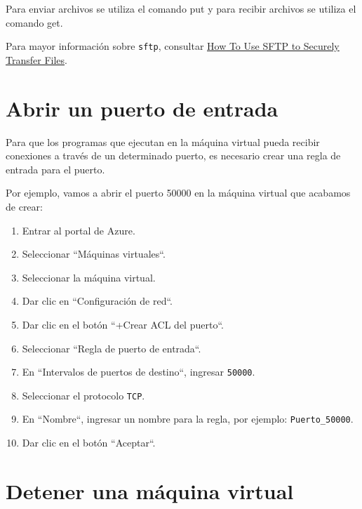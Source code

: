 \documentclass[11pt,a4paper,oneside]{book}
\begin{document}
Para enviar archivos se utiliza el comando put y para recibir archivos se utiliza el comando get.

Para mayor información sobre \texttt{sftp}, consultar \href{https://www.digitalocean.com/community/tutorials/how-to-use-sftp-to-securely-transfer-files-with-a-remote-server-es}{How To Use SFTP to Securely Transfer Files}.

\section{Abrir un puerto de entrada}

Para que los programas que ejecutan en la máquina virtual pueda recibir conexiones a través de un determinado puerto, es necesario crear una regla de entrada para el puerto.

Por ejemplo, vamos a abrir el puerto 50000 en la máquina virtual que acabamos de crear:

\begin{enumerate}

\item Entrar al portal de Azure.

\item Seleccionar ``Máquinas virtuales``.

\item Seleccionar la máquina virtual.

\item Dar clic en ``Configuración de red``.

\item Dar clic en el botón ``+Crear ACL del puerto``.

\item Seleccionar ``Regla de puerto de entrada``.

\item En ``Intervalos de puertos de destino``, ingresar \texttt{50000}.

\item Seleccionar el protocolo \texttt{TCP}.

\item En ``Nombre``, ingresar un nombre para la regla, por ejemplo: \texttt{Puerto\_50000}.

\item Dar clic en el botón ``Aceptar``.

\end{enumerate}

\section{Detener una máquina virtual}
\end{document}
